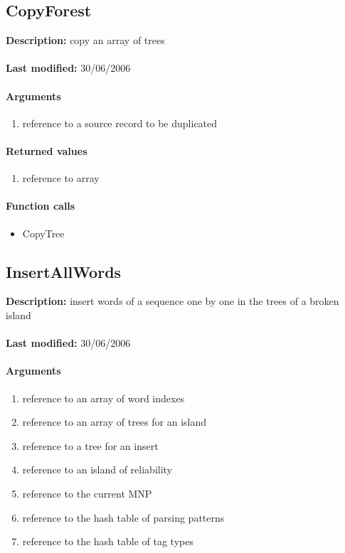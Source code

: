 \subsection{CopyForest}
\textbf{Description:} copy an array of trees\\
\\\textbf{Last modified:} 30/06/2006

\paragraph{Arguments}
\begin{enumerate}
\item reference to a source record to be duplicated
\end{enumerate}

\paragraph{Returned values}
\begin{enumerate}
\item reference to array
\end{enumerate}

\paragraph{Function calls}
\begin{itemize}
\item CopyTree
\end{itemize}

\subsection{InsertAllWords}
\textbf{Description:} insert words of a sequence one by one in the trees of a broken island\\
\\\textbf{Last modified:} 30/06/2006

\paragraph{Arguments}
\begin{enumerate}
\item reference to an array of word indexes
\item reference to an array of trees for an island
\item reference to a tree for an insert
\item reference to an island of reliability
\item reference to the current MNP
\item reference to the hash table of parsing patterns
\item reference to the hash table of tag types
\end{enumerate}

